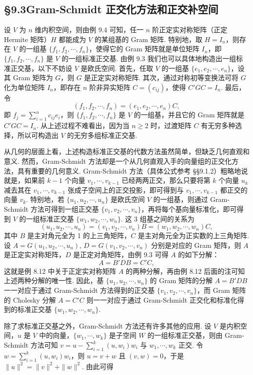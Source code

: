 \documentclass[UTF8, 12pt, fontset=fandol, oneside]{ctexart}
\begin{document}
\subsection*{§9.3\quad Gram-Schmidt 正交化方法和正交补空间}

设 $V$ 为 $n$ 维内积空间，则由例 9.4 可知，任一 $n$ 阶正定实对称矩阵（正定 Hermite 矩阵）$H$ 都能成为 $V$ 的某组基的 Gram 矩阵. 特别地，取 $H=I_n$，则存在 $V$ 的一组基 $\{f_1,f_2,\cdots,f_n\}$，使得它的 Gram 矩阵就是单位矩阵 $I_n$，即 $\{f_1,f_2,\cdots,f_n\}$ 是 $V$ 的一组标准正交基. 由例 9.3 我们也可以具体地构造出一组标准正交基，以下不妨设 $V$ 是欧氏空间. 首先，任取 $V$ 的一组基 $\{e_1,e_2,\cdots,e_n\}$，设其 Gram 矩阵为 $G$，则 $G$ 是正定实对称矩阵. 其次，通过对称初等变换法可将 $G$ 化为单位矩阵 $I_n$，即存在 $n$ 阶非异实矩阵 $C=(c_{ij})$，使得 $C'GC=I_n$. 最后，令
\[
(f_1,f_2,\cdots,f_n)=(e_1,e_2,\cdots,e_n)C,
\]
即 $f_j=\sum_{i=1}^n c_{ij}e_i$，则 $\{f_1,f_2,\cdots,f_n\}$ 是 $V$ 的一组基，并且它的 Gram 矩阵就是 $C'GC=I_n$. 从上述过程不难看出，因为当 $n\ge 2$ 时，过渡矩阵 $C$ 有无穷多种选择，所以可构造出 $V$ 的无穷多组标准正交基.

从几何的层面上看，上述构造标准正交基的代数方法虽然简单，但缺乏几何直观和意义. 然而，Gram-Schmidt 方法却是一个从几何直观入手的向量组的正交化方法，具有重要的几何意义. Gram-Schmidt 方法（具体公式参考 §§9.1.2）粗略地说就是，如果前 $k-1$ 个向量 $v_1,\cdots,v_{k-1}$ 已经两两正交，那么只要将第 $k$ 个向量 $u_k$ 减去其在 $v_1,\cdots,v_{k-1}$ 张成子空间上的正交投影，即可得到与 $v_1,\cdots,v_{k-1}$ 都正交的向量 $v_k$. 特别地，若 $\{u_1,u_2,\cdots,u_n\}$ 是欧氏空间 $V$ 的一组基，则通过 Gram-Schmidt 方法可得到一组正交基 $\{v_1,v_2,\cdots,v_n\}$，再将每个基向量标准化，即可得到 $V$ 的一组标准正交基 $\{w_1,w_2,\cdots,w_n\}$. 这 3 组基之间的关系为
\[
(u_1,u_2,\cdots,u_n)=(v_1,v_2,\cdots,v_n)B=(w_1,w_2,\cdots,w_n)C,
\]
其中 $B$ 是主对角元全为 1 的上三角矩阵，$C$ 是主对角元全为正实数的上三角矩阵. 设 $A=G(u_1,u_2,\cdots,u_n)$, $D=G(v_1,v_2,\cdots,v_n)$ 分别是对应的 Gram 矩阵，则 $A$ 是正定实对称矩阵，$D$ 是正定对角矩阵，由例 9.3 可得 $A$ 的如下分解：
\[
A=B'DB=C'C,
\]
这就是例 8.12 中关于正定实对称矩阵 $A$ 的两种分解，再由例 8.12 后面的注可知上述两种分解的唯一性. 因此，基 $\{u_1,u_2,\cdots,u_n\}$ 的 Gram 矩阵的分解 $A=B'DB$ 一一对应于通过 Gram-Schmidt 方法得到的正交基 $\{v_1,v_2,\cdots,v_n\}$，而 Gram 矩阵的 Cholesky 分解 $A=C'C$ 则一一对应于通过 Gram-Schmidt 正交化和标准化得到的标准正交基 $\{w_1,w_2,\cdots,w_n\}$.

除了求标准正交基之外，Gram-Schmidt 方法还有许多其他的应用. 设 $V$ 是内积空间，$u$ 是 $V$ 中的向量，$\{w_1,\cdots,w_k\}$ 是子空间 $W$ 的一组标准正交基，则由 Gram-Schmidt 方法可知 $v=u-\sum_{i=1}^k(u,w_i)w_i$ 与 $w_1,\cdots,w_k$ 正交. 令 $w=\sum_{i=1}^k(u,w_i)w_i$，则 $u=v+w$ 且 $(v,w)=0$，于是 $\|u\|^2=\|v\|^2+\|w\|^2$. 由此可得
\end{document}
